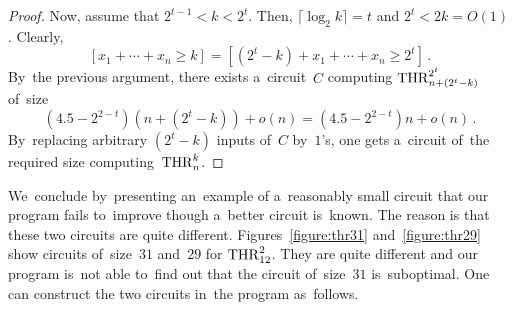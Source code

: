 \begin{proof}
    Now, assume that $2^{t-1}<k<2^t$. Then, $\lceil \log_2k \rceil = t$
    and $2^t<2k=O(1)$. Clearly,
    \[[x_1+\dotsb+x_n \ge k]=[(2^t-k)+x_1+\dotsb+x_n \ge 2^t] \, .\]
    By~the previous argument, there exists a~circuit~$C$ computing $\operatorname{THR}_{n+(2^t-k)}^{2^t}$ of~size
    \[(4.5-2^{2-t})(n+(2^t-k))+o(n)=(4.5-2^{2-t})n+o(n) \, .\]
    By~replacing arbitrary $(2^t-k)$ inputs of~$C$ by~$1$'s,
    one gets a~circuit of~the required size computing~$\operatorname{THR}_n^k$.
\end{proof}


We~conclude by~presenting an~example of a~reasonably small circuit
that our program fails to~improve though a~better circuit
is~known. The reason is that these two circuits are quite
different.
Figures~\ref{figure:thr31} and~\ref{figure:thr29} show circuits of~size~$31$ and~$29$ for $\operatorname{THR}_{12}^2$.
They are
quite different and our program is~not able to~find out
that the circuit
of~size~$31$ is~suboptimal.
One can construct the two circuits in~the program as~follows.

\inputminted[firstline=90,lastline=96]{python}{../tutorial.py}

